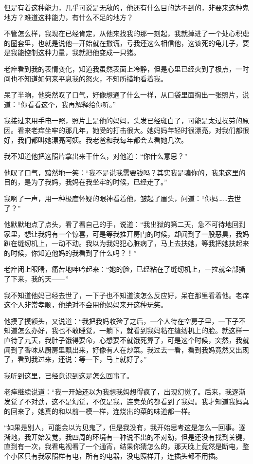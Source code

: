 但是有着这种能力，几乎可说是无敌的，他还有什么目的达不到的，非要来这种鬼地方？难道这种能力，有什么不足的地方？

不管怎么样，我现在已经肯定，从他来找我的那一刻起，我就掉进了一个处心积虑的圈套里，也就是说他一开始就在撒谎，亏我还这么相信他，这该死的龟儿子，要是我能控制这种力量，我就把他变成一只猪。

老痒看到我的表情变化，知道我虽然表面上冷静，但是心里已经火到了极点，一时间也不知道如何来平息我的怒火，不知所措地看着我。

呆了半晌，他突然叹了口气，好像想通了什么一样，从口袋里面掏出一张照片，说道：“你看看这个，我再解释给你听。”

我接过来用手电一照，照片上是他的妈妈，头发已经斑白了，可能是太过操劳的原因。看来老痒坐牢的那几年，她受的打击很大。她妈妈年轻时很漂亮，对我们都很好，我们都叫她漂亮阿姨。我老爸和我每年都会去看她几次。

我不知道他把这照片拿出来干什么，对他道：“你什么意思？”

他叹了口气，黯然地一笑：“我不是说我需要钱吗？其实我是骗你的，我来这里的目的，是为了我妈，我妈在我坐牢的时候，已经走了。”

我啊了一声，用一种极度怀疑的眼神看着他，皱起了眉头，问道：“你妈……去世了？”

他默默地点了点头，看了看自己的手，说道：“我出狱的第二天，急不可待地回到家里，想让我妈有一个惊喜，可是等我推开房门的时候，却闻到了一股恶臭，我妈趴在缝纫机上，一动不动。我以为我妈犯心脏病了，马上去扶她，等我把她扶起来的时候，你知道他妈的我看到了什么吗？！”

老痒闭上眼睛，痛苦地呻吟起来：“她的脸，已经粘在了缝纫机上，一拉就全部撕了下来，我的天——”

我不知道他妈已经去世了，一下子也不知道该怎么反应好，呆在那里看着他。老痒这个人非常孝顺，他绝对不会用他妈妈来开这种玩笑。

他摸了摸额头，又说道：“我把我妈收殓了之后，一个人待在空房子里，一下子不知道怎么办好，我也不敢睡觉，一躺下，就看到我妈粘在缝纫机上的脸。就这样一直待了九天，我肚子饿得要命，心想要不就饿死算了，可是这个时候，突然，我就闻到了香味从厨房里飘出来，好像有人在炒菜。我过去一看，看到我妈竟然又出现了，看到我过来，还说：等一下，马上就好了。”

我听到这里，已经意识到这是怎么回事了。

老痒继续说道：“我一开始还以为我想我妈想得疯了，出现幻觉了。后来，我逐渐发觉了不对劲，这不是幻觉，不仅是我，连卖菜的都看到了我妈。我才知道我妈真的回来了，她真的和以前一模一样，连烧出的菜的味道都一样。

“如果是别人，可能会以为见鬼了，但是我没有，我开始思考这是怎么一回事。逐渐地，我开始发觉，我四周的环境有一种说不出的不对劲，但是还没有找到关键，直到有一次，我看电视看了一个通宵，结果你猜怎么的，那天晚上竟然是断电，整个小区只有我家照样有电，所有的电器，没电照样开，连插头都不用插。

